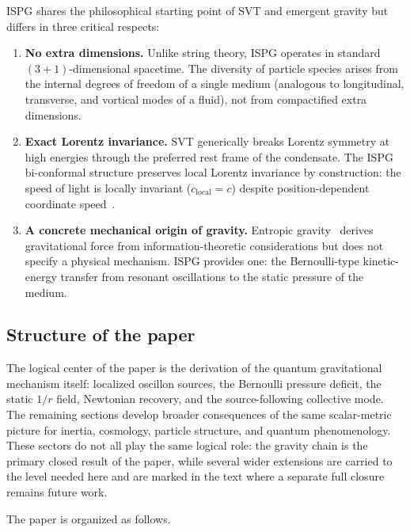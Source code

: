 \documentclass[aps,prd,onecolumn,superscriptaddress,nofootinbib,showpacs,12pt,notitlepage]{revtex4-2}
\begin{document}
ISPG shares the philosophical starting point of SVT and emergent
gravity but differs in three critical respects:

\begin{enumerate}
  \item \textbf{No extra dimensions.} Unlike string theory, ISPG operates
    in standard $(3\!+\!1)$-dimensional spacetime.  The diversity
    of particle species arises from the internal degrees of freedom of
    a single medium (analogous to longitudinal, transverse, and
    vortical modes of a fluid), not from compactified extra dimensions.

  \item \textbf{Exact Lorentz invariance.}  SVT generically breaks
    Lorentz symmetry at high energies through the preferred rest frame
    of the condensate.  The ISPG bi-conformal structure preserves local
    Lorentz invariance by construction: the speed of light is locally
    invariant ($c_{\mathrm{local}} = c$) despite position-dependent
    coordinate speed~\cite{Lotishvili2026}.

  \item \textbf{A concrete mechanical origin of gravity.}  Entropic
    gravity~\cite{Verlinde2011} derives gravitational force from
    information-theoretic considerations but does not specify a
    physical mechanism.  ISPG provides one: the Bernoulli-type
    kinetic-energy transfer from resonant oscillations to the static
    pressure of the medium.
\end{enumerate}

\subsection{Structure of the paper}

The logical center of the paper is the derivation of the quantum
gravitational mechanism itself: localized oscillon sources, the
Bernoulli pressure deficit, the static $1/r$ field, Newtonian
recovery, and the source-following collective mode.  The remaining
sections develop broader consequences of the same scalar-metric
picture for inertia, cosmology, particle structure, and quantum
phenomenology.  These sectors do not all play the same logical role:
the gravity chain is the primary closed result of the paper, while
several wider extensions are carried to the level needed here and are
marked in the text where a separate full closure remains future work.

The paper is organized as follows.
\end{document}
